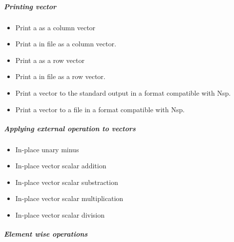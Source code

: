 \subparagraph{Printing vector}
\begin{itemize}
\item {}
  \sshortdescribe Print a  as a column vector
\item {}
  \sshortdescribe Print a  in file  as a column
  vector.
\item {}
  \sshortdescribe Print a  as a row vector
\item {}
  \sshortdescribe Print a  in file  as a row
  vector.
\item {}
  \sshortdescribe Print a vector to the standard output in a format
  compatible with Nsp.  
\item {}
  \sshortdescribe Print a vector to a file in a format compatible with Nsp. 
\end{itemize}

\subparagraph{Applying external operation to vectors}

\begin{itemize}
\item {}
  \sshortdescribe In-place unary minus
\item {}
  \sshortdescribe In-place vector scalar addition  
\item {}
  \sshortdescribe In-place vector scalar substraction  
\item {}
  \sshortdescribe In-place vector scalar multiplication  
\item {}
  \sshortdescribe In-place vector scalar division  
\end{itemize}

\subparagraph{Element wise operations}

